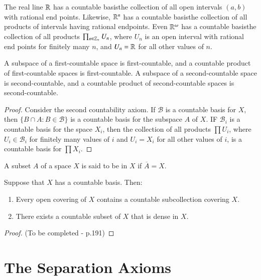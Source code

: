 \begin{example}
    The real line $\mathbb R$ has a countable basis\textendash the collection of all open intervals $(a,b)$ with rational end points. Likewise, $\mathbb R^n$ has a countable basis\textendash the collection of all products of intervals having rational endpoints. Even $\mathbb R^{\omega}$ has a countable basis\textendash the collection of all products $\prod_{n\in\mathbb Z_+}U_n$, where $U_n$ is an open interval with rational end points for finitely many $n$, and $U_n = \mathbb R$ for all other values of $n$.
\end{example}


\begin{theorem}
    A subspace of a first-countable space is first-countable, and a countable product of first-countable spaces is first-countable. A subspace of a second-countable space is second-countable, and a countable product of second-countable spaces is second-countable.
\end{theorem}
\begin{proof}
    Consider the second countability axiom. If $\mathcal{B}$ is a countable basis for $X$, then $\{B\cap A:B\in\mathcal{B}\}$ is a countable basis for the subspace $A$ of $X$. IF $\mathcal{B}_i$ is a countable basis for the space $X_i$, then the collection of all products $\prod U_i$, where $U_i \in \mathcal{B}_i$ for finitely many values of $i$ and $U_i = X_i$ for all other values of $i$, is a countable basis for $\prod X_i$.
\end{proof}


\begin{definition}
    A subset $A$ of a space $X$ is said to be  in $X$ if $\overline{A} = X$.
\end{definition}

\begin{theorem}
    Suppose that $X$ has a countable basis. Then: \begin{enumerate}
        \item Every open covering of $X$ contains a countable subcollection covering $X$.
        \item There exists a countable subset of $X$ that is dense in $X$.
    \end{enumerate}
\end{theorem}
\begin{proof}
    (To be completed - p.191)
\end{proof}

\section{The Separation Axioms}

